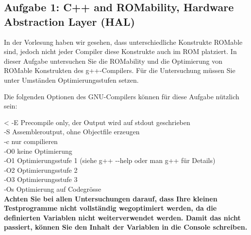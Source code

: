 \subsection{Aufgabe 1: C++ and ROMability, Hardware Abstraction Layer (HAL)}

In der Vorlesung haben wir gesehen, dass unterschiedliche Konstrukte ROMable sind, jedoch nicht jeder
Compiler diese Konstrukte auch im ROM platziert. In dieser Aufgabe untersuchen Sie die ROMability und die
Optimierung von ROMable Konstrukten des g++-Compilers. Für die Untersuchung müssen Sie unter Umständen
Optimierungsstufen setzen.

Die folgenden Optionen des GNU-Compilers können für diese Aufgabe nützlich sein:

\medskip
\noindent<
‐E  \qquad Precompile only, der Output wird auf stdout geschrieben\\
‐S  \qquad Assembleroutput, ohne Objectfile erzeugen\\
‐c \qquad nur compilieren\\
‐O0 \qquad keine Optimierung\\
‐O1 \qquad Optimierungsstufe 1 (siehe g++ ‐‐help oder man g++ für Details)\\
‐O2 \qquad Optimierungsstufe 2\\
‐O3 \qquad Optimierungsstufe 3\\
‐Os \qquad Optimierung auf Codegrösse\\

\textbf{Achten Sie bei allen Untersuchungen darauf, dass Ihre kleinen Testprogramme nicht vollständig
wegoptimiert werden, da die definierten Variablen nicht weiterverwendet werden. Damit das nicht
passiert, können Sie den Inhalt der Variablen in die Console schreiben.}

